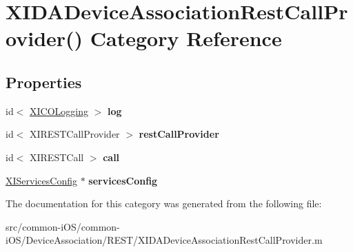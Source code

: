 \hypertarget{category_x_i_d_a_device_association_rest_call_provider_07_08}{}\section{X\+I\+D\+A\+Device\+Association\+Rest\+Call\+Provider() Category Reference}
\label{category_x_i_d_a_device_association_rest_call_provider_07_08}
\subsection*{Properties}
\begin{DoxyCompactItemize}
\item 
\hypertarget{category_x_i_d_a_device_association_rest_call_provider_07_08_a539000269e3b8c9f445d4a4f43f9fbb5}{}\label{category_x_i_d_a_device_association_rest_call_provider_07_08_a539000269e3b8c9f445d4a4f43f9fbb5} 
id$<$ \hyperlink{protocol_x_i_c_o_logging-p}{X\+I\+C\+O\+Logging} $>$ {\bfseries log}
\item 
\hypertarget{category_x_i_d_a_device_association_rest_call_provider_07_08_a38664b18d56d741c1e9c2df089d91615}{}\label{category_x_i_d_a_device_association_rest_call_provider_07_08_a38664b18d56d741c1e9c2df089d91615} 
id$<$ X\+I\+R\+E\+S\+T\+Call\+Provider $>$ {\bfseries rest\+Call\+Provider}
\item 
\hypertarget{category_x_i_d_a_device_association_rest_call_provider_07_08_aaae877f5fedd3ba762e5aba285d3cd63}{}\label{category_x_i_d_a_device_association_rest_call_provider_07_08_aaae877f5fedd3ba762e5aba285d3cd63} 
id$<$ X\+I\+R\+E\+S\+T\+Call $>$ {\bfseries call}
\item 
\hypertarget{category_x_i_d_a_device_association_rest_call_provider_07_08_ae6cbe9c8a853220010a618ceddf349a9}{}\label{category_x_i_d_a_device_association_rest_call_provider_07_08_ae6cbe9c8a853220010a618ceddf349a9} 
\hyperlink{interface_x_i_services_config}{X\+I\+Services\+Config} $\ast$ {\bfseries services\+Config}
\end{DoxyCompactItemize}


The documentation for this category was generated from the following file\+:\begin{DoxyCompactItemize}
\item 
src/common-\/i\+O\+S/common-\/i\+O\+S/\+Device\+Association/\+R\+E\+S\+T/X\+I\+D\+A\+Device\+Association\+Rest\+Call\+Provider.\+m\end{DoxyCompactItemize}
